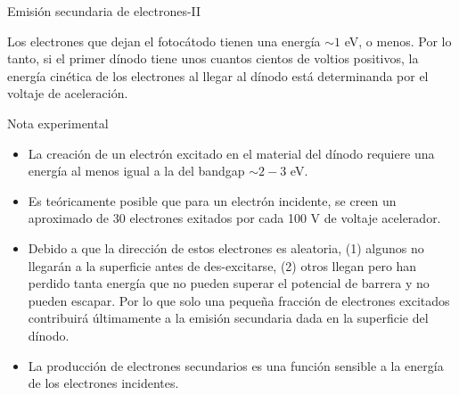 \documentclass[a4paper,10pt]{beamer}
\begin{document}
  
\begin{frame}{Emisión secundaria de electrones-II}

 \begin{footnotesize}Los electrones que dejan el fotocátodo tienen una energía $\sim 1$ eV, o menos. 
 Por lo tanto, si el primer dínodo tiene unos cuantos cientos de voltios positivos, 
 la energía cinética de los electrones al llegar al dínodo está determinanda por 
 el voltaje de aceleración. \end{footnotesize}
 
  \begin{exampleblock}{Nota experimental}
  \begin{footnotesize}
  \begin{itemize}[<+->]
   \item \begin{justify}
          La creación de un electrón excitado en el material del dínodo requiere una
          energía al menos igual a la del bandgap $\sim 2-3$ eV.
         \end{justify}
   \item \begin{justify}
          Es teóricamente posible que para un electrón incidente, se creen un 
          aproximado de 30 electrones exitados por cada 100 V de voltaje acelerador.
         \end{justify}
   \item \begin{justify}
          Debido a que la dirección de estos electrones es aleatoria, (1) algunos 
          no llegarán a la superficie antes de des-excitarse, (2) otros llegan 
          pero han perdido tanta energía que no pueden superar el potencial de barrera
          y no pueden escapar. Por lo que solo una pequeña fracción de electrones 
          excitados contribuirá últimamente a la emisión secundaria dada en la 
          superficie del dínodo.
         \end{justify}
   \item \begin{justify}
          La producción de electrones secundarios es una función sensible a la 
          energía de los electrones incidentes.
         \end{justify}

  \end{itemize}  
  \end{footnotesize}
 \end{exampleblock}
\end{frame}
\end{document}
